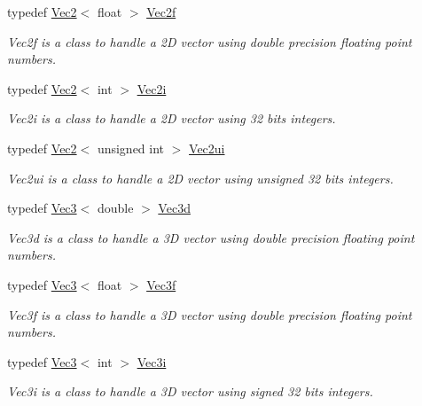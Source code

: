 \begin{DoxyCompactItemize}
typedef \hyperlink{class_math_1_1_vec2}{Vec2}$<$ float $>$ \hyperlink{namespace_utilities_ab79b80d506ad1b46bfb4f7979293d5d9}{Vec2f}
\begin{DoxyCompactList}\small\item\em Vec2f is a class to handle a 2D vector using double precision floating point numbers. \end{DoxyCompactList}\item 
typedef \hyperlink{class_math_1_1_vec2}{Vec2}$<$ int $>$ \hyperlink{namespace_utilities_a491fc17b2e433b915d450c5fd8bcb459}{Vec2i}
\begin{DoxyCompactList}\small\item\em Vec2i is a class to handle a 2D vector using 32 bits integers. \end{DoxyCompactList}\item 
typedef \hyperlink{class_math_1_1_vec2}{Vec2}$<$ unsigned int $>$ \hyperlink{namespace_utilities_a4a3a98a70cd4c9af9c3e49584516902f}{Vec2ui}
\begin{DoxyCompactList}\small\item\em Vec2ui is a class to handle a 2D vector using unsigned 32 bits integers. \end{DoxyCompactList}\item 
typedef \hyperlink{class_math_1_1_vec3}{Vec3}$<$ double $>$ \hyperlink{namespace_utilities_ab28ebcaa8d9272ab9f9375205bded517}{Vec3d}
\begin{DoxyCompactList}\small\item\em Vec3d is a class to handle a 3D vector using double precision floating point numbers. \end{DoxyCompactList}\item 
typedef \hyperlink{class_math_1_1_vec3}{Vec3}$<$ float $>$ \hyperlink{namespace_utilities_a39dfee93d59fd420ecf496f66606cbdd}{Vec3f}
\begin{DoxyCompactList}\small\item\em Vec3f is a class to handle a 3D vector using double precision floating point numbers. \end{DoxyCompactList}\item 
typedef \hyperlink{class_math_1_1_vec3}{Vec3}$<$ int $>$ \hyperlink{namespace_utilities_a49caf0d054fbd5f9eb148ed40ad97dcc}{Vec3i}
\begin{DoxyCompactList}\small\item\em Vec3i is a class to handle a 3D vector using signed 32 bits integers. \end{DoxyCompactList}\item 

\end{DoxyCompactItemize}
